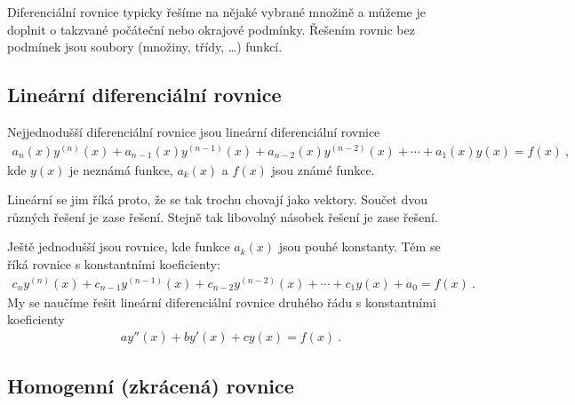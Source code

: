 Diferenciální rovnice typicky řešíme na nějaké vybrané množině a můžeme je doplnit o takzvané počáteční nebo okrajové podmínky. Řešením rovnic bez podmínek jsou soubory (množiny, třídy, \dots) funkcí.

\subsection{Lineární diferenciální rovnice}

Nejjednodušší diferenciální rovnice jsou lineární diferenciální rovnice 
\begin{align}
    a_n(x) y^{(n)}(x) + a_{n-1}(x) y^{(n-1)}(x) + a_{n-2}(x) y^{(n-2)}(x) + \cdots + a_1(x) y(x) = f(x) \:,
\end{align}
kde $y(x)$ je neznámá funkce, $a_k(x)$ a $f(x)$ jsou známé funkce.

Lineární se jim říká proto, že se tak trochu chovají jako vektory. Součet dvou různých řešení je zase řešení. Stejně tak libovolný násobek řešení je zase řešení.

Ještě jednodušší jsou rovnice, kde funkce $a_k(x)$ jsou pouhé konstanty. Těm se říká rovnice s konstantními koeficienty:
\begin{align}
    c_n y^{(n)}(x) + c_{n-1} y^{(n-1)}(x) + c_{n-2} y^{(n-2)}(x) + \cdots + c_1 y(x) + a_0 = f(x) \:.
\end{align}
My se naučíme řešit lineární diferenciální rovnice druhého řádu s konstantními koeficienty 
\begin{align}
    a y''(x) + b y'(x) + c y(x) = f(x) \:.
\end{align}

\subsection{Homogenní (zkrácená) rovnice}

